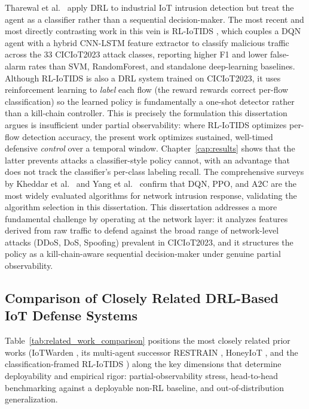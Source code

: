 Tharewal et al.\ \cite{Tharewal2022} apply DRL to industrial IoT intrusion detection but treat the agent as a classifier rather than a sequential decision-maker. The most recent and most directly contrasting work in this vein is RL-IoTIDS \cite{Odeh2026}, which couples a DQN agent with a hybrid CNN-LSTM feature extractor to classify malicious traffic across the 33 CICIoT2023 attack classes, reporting higher F1 and lower false-alarm rates than SVM, RandomForest, and standalone deep-learning baselines. Although RL-IoTIDS is also a DRL system trained on CICIoT2023, it uses reinforcement learning to \emph{label} each flow (the reward rewards correct per-flow classification) so the learned policy is fundamentally a one-shot detector rather than a kill-chain controller. This is precisely the formulation this dissertation argues is insufficient under partial observability: where RL-IoTIDS optimizes per-flow detection accuracy, the present work optimizes sustained, well-timed defensive \emph{control} over a temporal window. Chapter~\ref{cap:results} shows that the latter prevents attacks a classifier-style policy cannot, with an advantage that does not track the classifier's per-class labeling recall. The comprehensive surveys by Kheddar et al.~\cite{Kheddar2024} and Yang et al.~\cite{Yang2024} confirm that DQN, PPO, and A2C are the most widely evaluated algorithms for network intrusion response, validating the algorithm selection in this dissertation. This dissertation addresses a more fundamental challenge by operating at the network layer: it analyzes features derived from raw traffic to defend against the broad range of network-level attacks (DDoS, DoS, Spoofing) prevalent in CICIoT2023, and it structures the policy as a kill-chain-aware sequential decision-maker under genuine partial observability.

\subsection{Comparison of Closely Related DRL-Based IoT Defense Systems}
Table~\ref{tab:related_work_comparison} positions the most closely related prior works (IoTWarden \cite{Alam2024}, its multi-agent successor RESTRAIN \cite{Alam2025}, HoneyIoT \cite{Guan2023}, and the classification-framed RL-IoTIDS \cite{Odeh2026}) along the key dimensions that determine deployability and empirical rigor: partial-observability stress, head-to-head benchmarking against a deployable non-RL baseline, and out-of-distribution generalization.

